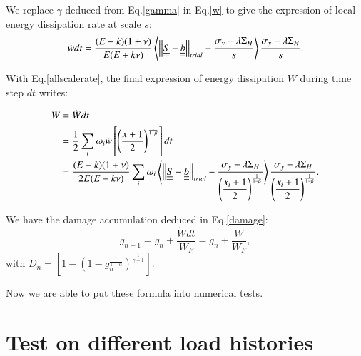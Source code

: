 \documentclass[3p,times,number,review]{elsarticle}
\begin{document}
We replace $\gamma$ deduced from Eq.\eqref{gamma} in Eq.\eqref{w} to give the expression of local energy dissipation rate at scale $s$:
\begin{equation}
\dot{w}dt=\dfrac{(E-k)(1+\nu) }{E(E+k\nu)}\left\langle  \left| \left|\uline{\uline{S}}-\uline{\uline{b}}\right| \right|_{trial}-\dfrac{\sigma_y-\lambda \Sigma_H}{s}\right\rangle \dfrac{\sigma_y-\lambda \Sigma_H}{s}.
\label{dW}
\end{equation}

With Eq.\eqref{allscalerate}, the final expression of energy dissipation $W$ during time step $dt$ writes:

\begin{equation}
  \begin{split}
W&=\dot{W}dt
\\&=\frac{1}{2}\sum_{i}\omega_i\dot{w}\left[  \left( \frac{x+1}{2}\right) ^{\frac{1}{1-\beta}}\right]dt
\\&=\dfrac{(E-k)(1+\nu) }{2E(E+k\nu)}\sum_{i}\omega_i\left\langle  \left| \left|\uline{\uline{S}}-\uline{\uline{b}}\right| \right|_{trial}-\dfrac{\sigma_y-\lambda \Sigma_H}{\left( \dfrac{x_i+1}{2}\right) ^{\frac{1}{1-\beta}}}\right\rangle \dfrac{\sigma_y-\lambda \Sigma_H}{\left( \dfrac{x_i+1}{2}\right) ^{\frac{1}{1-\beta}}}.
  \end{split}
\label{finaldw}
\end{equation}


We have the damage accumulation deduced in Eq.\eqref{damage}:
$$g_{n+1}=g_n+\dfrac{\dot{W}dt}{W_F}=g_n+\dfrac{W}{W_F},$$
with $D_n=\left[1-\left(1-g_n^{\frac{1}{1-\alpha}} \right)^{\frac{1}{\gamma+1}}  \right]. $
 
 Now we are able to put these formula into numerical tests.
 
\section{Test on different load histories}
\end{document}
